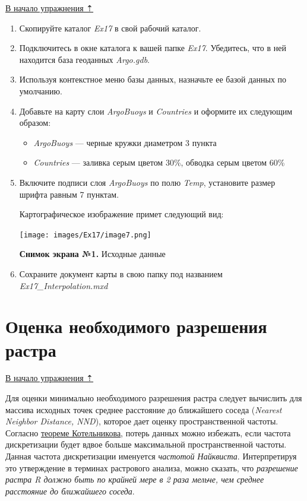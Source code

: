 \documentclass[12pt,]{book}
\providecommand{\tightlist}{%
  \setlength{\itemsep}{0pt}\setlength{\parskip}{0pt}}
\begin{document}
\protect\hyperlink{interpolation}{В начало упражнения ⇡}

\begin{enumerate}
\def\labelenumi{\arabic{enumi}.}
\item
  Скопируйте каталог \emph{Ex17} в свой рабочий каталог.
\item
  Подключитесь в окне каталога к вашей папке \emph{Ex17}. Убедитесь, что в ней находится база геоданных \emph{Argo.gdb}.
\item
  Используя контекстное меню базы данных, назначьте ее базой данных по умолчанию.
\item
  Добавьте на карту слои \emph{ArgoBuoys} и \emph{Countries} и оформите их следующим образом:

  \begin{itemize}
  \tightlist
  \item
    \emph{ArgoBuoys} --- черные кружки диаметром 3 пункта
  \item
    \emph{Countries} --- заливка серым цветом 30\%, обводка серым цветом 60\%
  \end{itemize}
\item
  Включите подписи слоя \emph{ArgoBuoys} по полю \emph{Temp}, установите размер шрифта равным 7 пунктам.

  Картографическое изображение примет следующий вид:

  \texttt{[image: images/Ex17/image7.png]}

  \textbf{Снимок экрана №1.} Исходные данные
\item
  Сохраните документ карты в свою папку под названием \emph{Ex17\_Interpolation.mxd}
\end{enumerate}

\hypertarget{interpolation-resolution}{%
\section{Оценка необходимого разрешения растра}\label{interpolation-resolution}}

\protect\hyperlink{interpolation}{В начало упражнения ⇡}

Для оценки минимально необходимого разрешения растра следует вычислить для массива исходных точек среднее расстояние до ближайшего соседа (\emph{Nearest Neighbor Distance, NND}), которое дает оценку пространственной частоты. Согласно \href{https://ru.wikipedia.org/wiki/Теорема_Котельникова}{теореме Котельникова}, потерь данных можно избежать, если частота дискретизации будет вдвое больше максимальной пространственной частоты. Данная частота дискретизации именуется \emph{частотой Найквиста}. Интерпретируя это утверждение в терминах растрового анализа, можно сказать, что \emph{разрешение растра R должно быть по крайней мере в 2 раза мельче, чем среднее расстояние до ближайшего соседа}.
\end{document}
